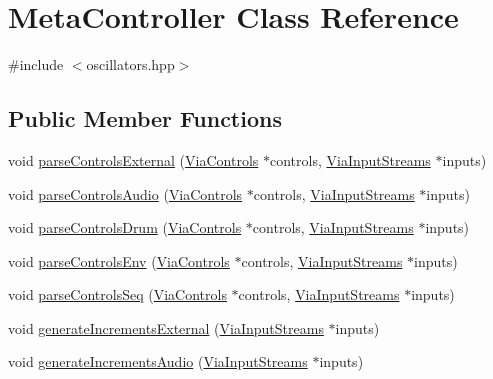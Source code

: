 \hypertarget{class_meta_controller}{}\section{Meta\+Controller Class Reference}
\label{class_meta_controller}


{\ttfamily \#include $<$oscillators.\+hpp$>$}

\subsection*{Public Member Functions}
\begin{DoxyCompactItemize}
\item 
void \mbox{\hyperlink{class_meta_controller_a04a33cca84424c10d37cddecb663f619}{parse\+Controls\+External}} (\mbox{\hyperlink{class_via_controls}{Via\+Controls}} $\ast$controls, \mbox{\hyperlink{class_via_input_streams}{Via\+Input\+Streams}} $\ast$inputs)
\item 
void \mbox{\hyperlink{class_meta_controller_ae12fe6794e457ed924fe53142eed83c7}{parse\+Controls\+Audio}} (\mbox{\hyperlink{class_via_controls}{Via\+Controls}} $\ast$controls, \mbox{\hyperlink{class_via_input_streams}{Via\+Input\+Streams}} $\ast$inputs)
\item 
void \mbox{\hyperlink{class_meta_controller_a557b81488e8c917eaacf8ae65fd85724}{parse\+Controls\+Drum}} (\mbox{\hyperlink{class_via_controls}{Via\+Controls}} $\ast$controls, \mbox{\hyperlink{class_via_input_streams}{Via\+Input\+Streams}} $\ast$inputs)
\item 
void \mbox{\hyperlink{class_meta_controller_a5f3e148b9730b47b9d3105d39dd88938}{parse\+Controls\+Env}} (\mbox{\hyperlink{class_via_controls}{Via\+Controls}} $\ast$controls, \mbox{\hyperlink{class_via_input_streams}{Via\+Input\+Streams}} $\ast$inputs)
\item 
void \mbox{\hyperlink{class_meta_controller_ac337c31f2c24c6a51684a44c8947e178}{parse\+Controls\+Seq}} (\mbox{\hyperlink{class_via_controls}{Via\+Controls}} $\ast$controls, \mbox{\hyperlink{class_via_input_streams}{Via\+Input\+Streams}} $\ast$inputs)
\item 
void \mbox{\hyperlink{class_meta_controller_a37edb9a2541a99701a7095c5df577b63}{generate\+Increments\+External}} (\mbox{\hyperlink{class_via_input_streams}{Via\+Input\+Streams}} $\ast$inputs)
\item 
void \mbox{\hyperlink{class_meta_controller_a672ae7cfd750f7bbda998ad6ad407bb8}{generate\+Increments\+Audio}} (\mbox{\hyperlink{class_via_input_streams}{Via\+Input\+Streams}} $\ast$inputs)

\end{DoxyCompactItemize}
